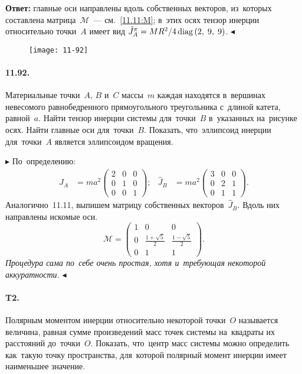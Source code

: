 \documentclass{weekly}
\begin{document}
\textbf{Ответ:}
главные оси направлены вдоль собственных векторов, из~которых
составлена матрица~$\mathcal{M}$~--- см.~\eqref{11.11:M};
в~этих осях тензор инерции относительно точки~$A$ имеет вид
$\hat J_A^\pi = MR^2/4 \operatorname{diag} \left(2, \; 9, \; 9\right)$.
\hfill $\blacktriangleleft$


\clearpage
\begin{wrapfigure}[6]{r}{.2\textwidth}
    \texttt{[image: 11-92]}
\end{wrapfigure}
\paragraph{11.92.} Материальные точки~$A$, $B$ и~$C$ массы~$m$ каждая
находятся в~вершинах невесомого равнобедренного прямоугольного
треугольника с~длиной катета, равной~$a$. Найти тензор инерции системы
для~точки~$B$ в~указанных на~рисунке осях. Найти главные оси
для~точки~$B$. Показать, что~эллипсоид инерции для~точки~$A$
является эллипсоидом вращения.

$\blacktriangleright$ По~определению:
\begin{align}
    \hat J_A &= ma^2 \begin{pmatrix}
        2 & 0 & 0 \\
        0 & 1 & 0 \\
        0 & 0 & 1
    \end{pmatrix};
&
    \hat J_B &= ma^2 \begin{pmatrix}
        3 & 0 & 0 \\
        0 & 2 & 1 \\
        0 & 1 & 1
    \end{pmatrix}.
\end{align}
Аналогично~11.11, выпишем матрицу собственных векторов~$\hat J_B$.
Вдоль них направлены искомые оси.
\begin{equation}
    \mathcal{M} = \begin{pmatrix}
        1 & 0 & 0 \\
        0 & \frac{1 + \sqrt{5}}{2} & \frac{1 - \sqrt{5}}{2} \\
        0 & 1 & 1
    \end{pmatrix}.
\end{equation}
\emph{Процедура сама по~себе очень простая, хотя и~требующая
некоторой аккуратности.}
\hfill $\blacktriangleleft$


\paragraph{T2.} Полярным моментом инерции относительно некоторой
точки~$O$ называется величина, равная сумме произведений масс
точек системы на~квадраты их расстояний до~точки~$O$.
Показать, что~центр масс системы можно определить как~такую
точку пространства, для~которой полярный момент инерции имеет
наименьшее значение.
\end{document}

